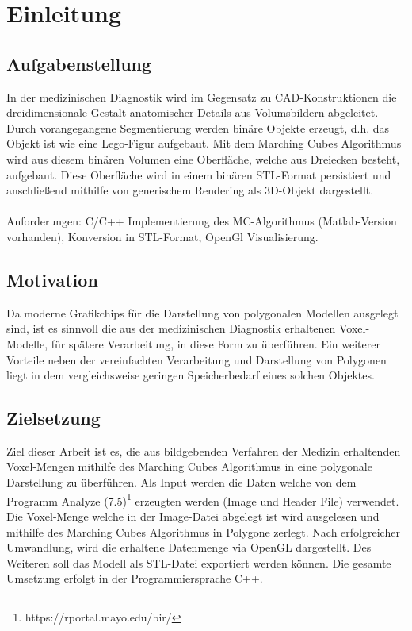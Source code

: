 \chapter{Einleitung}

\section{Aufgabenstellung}
In der medizinischen Diagnostik wird im Gegensatz zu CAD-Konstruktionen die dreidimensionale
Gestalt anatomischer Details aus Volumsbildern abgeleitet. Durch vorangegangene Segmentierung werden binäre Objekte erzeugt, d.h. das Objekt ist wie eine Lego-Figur aufgebaut. Mit dem Marching Cubes Algorithmus wird aus diesem binären Volumen eine Oberfläche, welche aus Dreiecken besteht, aufgebaut. Diese Oberfläche wird in einem binären STL-Format persistiert und anschließend mithilfe von generischem Rendering als 3D-Objekt dargestellt.\\\\
Anforderungen: C/C++ Implementierung des MC-Algorithmus (Matlab-Version vorhanden), Konversion in STL-Format, OpenGl Visualisierung.

\section{Motivation}
Da moderne Grafikchips für die Darstellung von polygonalen Modellen ausgelegt sind, ist es sinnvoll die aus der medizinischen Diagnostik erhaltenen Voxel-Modelle, für spätere Verarbeitung, in diese Form zu überführen. Ein weiterer Vorteile neben der vereinfachten Verarbeitung und Darstellung von Polygonen liegt in dem vergleichsweise geringen Speicherbedarf eines solchen Objektes.

\section{Zielsetzung}
Ziel dieser Arbeit ist es, die aus bildgebenden Verfahren der Medizin erhaltenden Voxel-Mengen mithilfe des Marching Cubes Algorithmus in eine polygonale Darstellung zu überführen. Als Input werden die Daten welche von dem Programm Analyze (7.5)\footnote{https://rportal.mayo.edu/bir/} erzeugten werden (Image und Header File) verwendet. Die Voxel-Menge welche in der Image-Datei abgelegt ist wird ausgelesen und mithilfe des Marching Cubes Algorithmus in Polygone zerlegt. Nach erfolgreicher Umwandlung, wird die erhaltene Datenmenge via OpenGL dargestellt. Des Weiteren soll das Modell als STL-Datei exportiert werden können. Die gesamte Umsetzung erfolgt in der Programmiersprache C++. 
